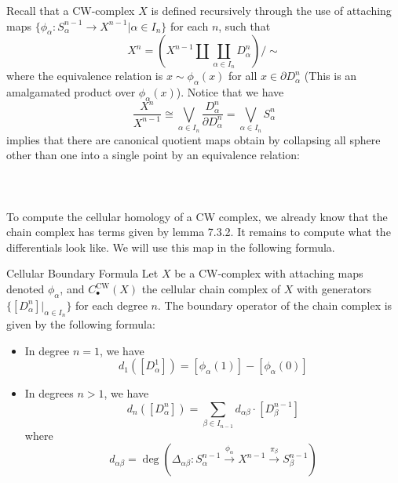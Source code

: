 \documentclass[a4paper]{article}
\begin{document}
Recall that a CW-complex $X$ is defined recursively through the use of attaching maps $\{\phi_\alpha:S_\alpha^{n-1}\to X^{n-1}|\alpha\in I_n\}$ for each $n$, such that $$X^n=\left(X^{n-1}\amalg\coprod_{\alpha\in I_n}D_\alpha^n\right)/\sim$$ where the equivalence relation is $x\sim\phi_\alpha(x)$ for all $x\in\partial D_\alpha^n$ (This is an amalgamated product over $\phi_\alpha(x)$). Notice that we have $$\frac{X^n}{X^{n-1}}\cong\bigvee_{\alpha\in I_n}\frac{D_\alpha^n}{\partial D_\alpha^n}=\bigvee_{\alpha\in I_n} S_\alpha^n$$ implies that there are canonical quotient maps obtain by collapsing all sphere other than one into a single point by an equivalence relation: \\~\\
 \\~\\

To compute the cellular homology of a CW complex, we already know that the chain complex has terms given by lemma 7.3.2. It remains to compute what the differentials look like. We will use this map in the following formula. 

\begin{thm}{Cellular Boundary Formula}{} Let $X$ be a CW-complex with attaching maps denoted $\phi_\alpha$, and $C_\bullet^\text{CW}(X)$ the cellular chain complex of $X$ with generators $\{[D_\alpha^n]|_{\alpha\in I_n}\}$ for each degree $n$. The boundary operator of the chain complex is given by the following formula: 
\begin{itemize}
\item In degree $n=1$, we have $$d_1\left([D_\alpha^1]\right)=[\phi_\alpha(1)]-[\phi_\alpha(0)]$$
\item In degrees $n>1$, we have $$d_n\left([D_\alpha^n]\right)=\sum_{\beta\in I_{n-1}}d_{\alpha\beta}\cdot[D_\beta^{n-1}]$$ where $$d_{\alpha\beta}=\deg\left(\Delta_{\alpha\beta}:S_\alpha^{n-1}\overset{\phi_\alpha}{\rightarrow}X^{n-1}\overset{\pi_\beta}{\rightarrow}S_\beta^{n-1}\right)$$ 
\end{itemize}
\end{thm}
\end{document}
